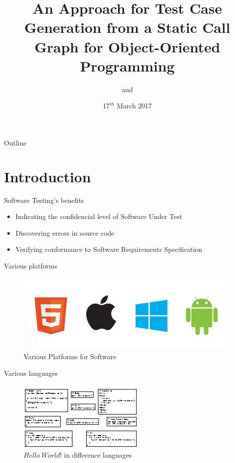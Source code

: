\documentclass{beamer}
\title{An Approach for Test Case Generation from a Static Call Graph for Object-Oriented Programming}
\date{17$^{th}$ March 2017}
\author{\authorNameEN~\small{and~\advisorEn}}
\institute{Department of Computer Engineering \\ %
{\facultyEn}, {\universityEn}
}
\begin{document}
\maketitle

\begin{frame}[t]{Outline}
    \tableofcontents[hideallsubsections]
\end{frame}

\newcommand{\displayframe}{%
    \begin{frame}{Outline}
    \tableofcontents[%
        currentsection,
        subsectionstyle=hide
        ]
    \end{frame}
}
%
\section{Introduction}
\begin{frame}{Software Testing's benefits}
  \begin{itemize}
     \item Indicating the confidencial level of Software Under Test
     \item Discovering errors in source code
     \item Verifying conformance to Software Requirements Specification
  \end{itemize}
\end{frame}

\begin{frame}{Various platforms}
    \begin{figure}
        \includegraphics[width=.8\paperwidth]{figure/mobile_bugs}
        \caption{Various Platforms for Software}
        \label{fig:variousplatform}
    \end{figure}
\end{frame}

\begin{frame}{Various languages}
    \begin{figure}
        \includegraphics[width=.9\paperwidth]{figure/hello-world-lang}
        \caption{$Hello~World!$ in difference languages}
        \label{fig:helloworld}
    \end{figure}
\end{frame}
\end{document}
